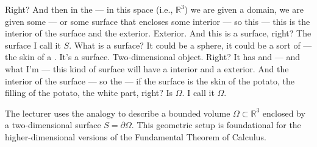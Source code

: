 \begin{spoken-clean}[00:11:00 - 00:12:28]
Right? And then in the — in this space (i.e., $\mathbb{R}^3$) we are given a domain, we are given some — or some surface that encloses some interior — so this — this is the interior of the surface and the exterior. Exterior. And this is a surface, right? The surface I call it $S$. What is a surface? It could be a sphere, it could be a sort of — the skin of a . It's a surface. Two-dimensional object. Right? It has and — and what I'm — this kind of surface will have a interior and a exterior. And the interior of the surface — so the — if the surface is the skin of the potato, the filling of the potato, the white part, right? Is $\Omega$. I call it $\Omega$.
\end{spoken-clean}

\begin{math-stroke}
\begin{ai-tikz-planner-invisible-content}
\end{ai-tikz-planner-invisible-content}
\begin{center}
\end{center}
\begin{explanation-of-steps}
The lecturer uses the  analogy to describe a bounded volume $\Omega \subset \mathbb{R}^3$ enclosed by a two-dimensional surface $S = \partial \Omega$. This geometric setup is foundational for the higher-dimensional versions of the Fundamental Theorem of Calculus.
\end{explanation-of-steps}
\end{math-stroke}

